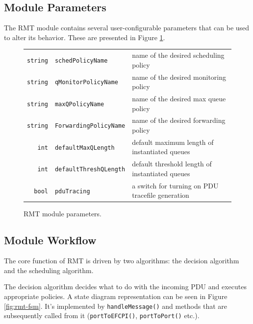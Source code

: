         \subsection{Module Parameters}
            The RMT module contains several user-configurable parameters that can be used to alter its behavior. These are presented in Figure \ref{fig:rmt_params}.

            \begin{figure}[H]
                \begin{center}
                  \begin{tabular}{ r l | l }
                    \hline
                    \texttt{string} & \texttt{schedPolicyName} & name of the desired scheduling policy \\
                    \texttt{string} & \texttt{qMonitorPolicyName} & name of the desired monitoring policy \\
                    \texttt{string} & \texttt{maxQPolicyName} & name of the desired max queue policy \\
                    \texttt{string} & \texttt{ForwardingPolicyName} & name of the desired forwarding policy \\
                    \texttt{int} & \texttt{defaultMaxQLength} & default maximum length of instantiated queues \\
                    \texttt{int} & \texttt{defaultThreshQLength} & default threshold length of instantiated queues \\
                    \texttt{bool} & \texttt{pduTracing} & a switch for turning on PDU tracefile generation \\
                    \hline
                  \end{tabular}
                  \caption{RMT module parameters.}
                  \label{fig:rmt_params}
                \end{center}
            \end{figure}

        \subsection{Module Workflow}

            The core function of RMT is driven by two algorithms: the decision algorithm and the scheduling algorithm.

            The decision algorithm decides what to do with the incoming PDU and executes appropriate policies. A state diagram representation can be seen in Figure \ref{fig:rmt-fsm}. It's implemented by \texttt{handleMessage()} and methods that are subsequently called from it (\texttt{portToEFCPI()}, \texttt{portToPort()} etc.).

